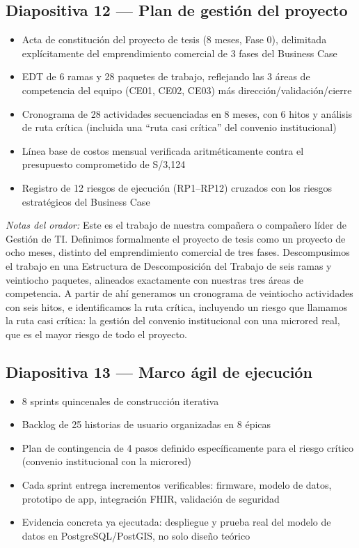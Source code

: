 \documentclass[11pt,a4paper]{article}
\providecommand{\tightlist}{%
  \setlength{\itemsep}{0pt}\setlength{\parskip}{0pt}}
\begin{document}
\subsection{Diapositiva 12 --- Plan de gestión del proyecto}\label{diapositiva-12-plan-de-gestiuxf3n-del-proyecto}

\begin{itemize}
\tightlist
\item
  Acta de constitución del proyecto de tesis (8 meses, Fase 0), delimitada explícitamente del emprendimiento comercial de 3 fases del Business Case
\item
  EDT de 6 ramas y 28 paquetes de trabajo, reflejando las 3 áreas de competencia del equipo (CE01, CE02, CE03) más dirección/validación/cierre
\item
  Cronograma de 28 actividades secuenciadas en 8 meses, con 6 hitos y análisis de ruta crítica (incluida una ``ruta casi crítica'' del convenio institucional)
\item
  Línea base de costos mensual verificada aritméticamente contra el presupuesto comprometido de S/3,124
\item
  Registro de 12 riesgos de ejecución (RP1--RP12) cruzados con los riesgos estratégicos del Business Case
\end{itemize}

\emph{Notas del orador:} Este es el trabajo de nuestra compañera o compañero líder de Gestión de TI. Definimos formalmente el proyecto de tesis como un proyecto de ocho meses, distinto del emprendimiento comercial de tres fases. Descompusimos el trabajo en una Estructura de Descomposición del Trabajo de seis ramas y veintiocho paquetes, alineados exactamente con nuestras tres áreas de competencia. A partir de ahí generamos un cronograma de veintiocho actividades con seis hitos, e identificamos la ruta crítica, incluyendo un riesgo que llamamos la ruta casi crítica: la gestión del convenio institucional con una microred real, que es el mayor riesgo de todo el proyecto.

\subsection{Diapositiva 13 --- Marco ágil de ejecución}\label{diapositiva-13-marco-uxe1gil-de-ejecuciuxf3n}

\begin{itemize}
\tightlist
\item
  8 sprints quincenales de construcción iterativa
\item
  Backlog de 25 historias de usuario organizadas en 8 épicas
\item
  Plan de contingencia de 4 pasos definido específicamente para el riesgo crítico (convenio institucional con la microred)
\item
  Cada sprint entrega incrementos verificables: firmware, modelo de datos, prototipo de app, integración FHIR, validación de seguridad
\item
  Evidencia concreta ya ejecutada: despliegue y prueba real del modelo de datos en PostgreSQL/PostGIS, no solo diseño teórico
\end{itemize}
\end{document}
